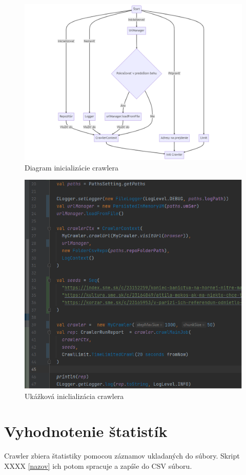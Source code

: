 \begin{figure}[!ht]
    \centering
    \includegraphics[width=1\textwidth]{figures/initChart.png}
    \caption{Diagram inicializácie crawlera\label{o:initChart}}
\end{figure}

\begin{figure}[!ht]
    \centering
    \includegraphics[width=.9\textwidth]{figures/crawlInit.png}
    \caption{Ukážková iniclializácia crawlera\label{o:initCrawl2}}
\end{figure}

\section{Vyhodnotenie štatistík}
Crawler zbiera štatistiky pomocou záznamov ukladaných do súbory. Skript XXXX \ref{nazov} ich potom spracuje a zapíše do CSV súboru. 

